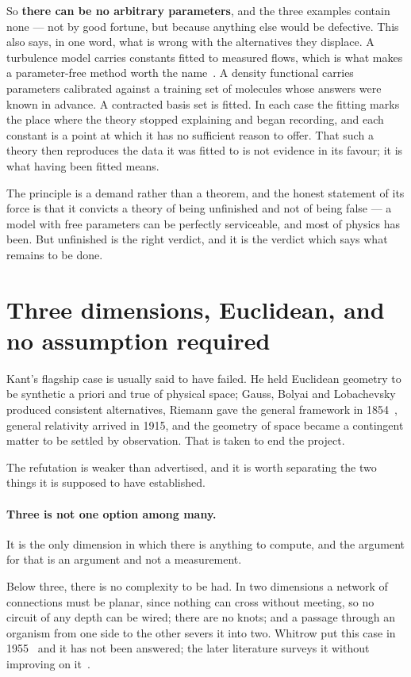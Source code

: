 \documentclass[11pt]{article}
\begin{document}
So \textbf{there can be no arbitrary parameters}, and the three examples contain none --- not by
good fortune, but because anything else would be defective. This also says, in one word, what is
wrong with the alternatives they displace. A turbulence model carries constants fitted to measured
flows, which is what makes a parameter-free method worth the name~\cite{parameterfree}. A density functional carries parameters calibrated against a training set of molecules whose
answers were known in advance. A contracted basis set is fitted. In each case the fitting marks the
place where the theory stopped explaining and began recording, and each constant is a point at which
it has no sufficient reason to offer. That such a theory then reproduces the data it was fitted to
is not evidence in its favour; it is what having been fitted means.

The principle is a demand rather than a theorem, and the honest statement of its force is that it
convicts a theory of being unfinished and not of being false --- a model with free parameters can
be perfectly serviceable, and most of physics has been. But unfinished is the right verdict, and it
is the verdict which says what remains to be done.

\section{Three dimensions, Euclidean, and no assumption required}\label{sec:kant-wrong}

Kant's flagship case is usually said to have failed. He held Euclidean geometry to be synthetic a
priori and true of physical space; Gauss, Bolyai and Lobachevsky produced consistent alternatives,
Riemann gave the general framework in 1854~\cite{riemann}, general relativity arrived in 1915, and the geometry of
space became a contingent matter to be settled by observation. That is taken to end the project.

The refutation is weaker than advertised, and it is worth separating the two things it is supposed
to have established.

\paragraph{Three is not one option among many.} It is the only dimension in which there is anything
to compute, and the argument for that is an argument and not a measurement.

Below three, there is no complexity to be had. In two dimensions a network of connections must be
planar, since nothing can cross without meeting, so no circuit of any depth can be wired; there are
no knots; and a passage through an organism from one side to the other severs it into two. Whitrow
put this case in 1955~\cite{whitrow} and it has not been answered; the later literature surveys it
without improving on it~\cite{barrowtipler}.
\end{document}
